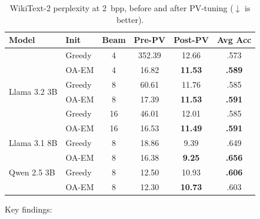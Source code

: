 \documentclass[11pt]{article}
\begin{document}
\begin{table}[h]
\centering
\caption{WikiText-2 perplexity at 2~bpp, before and after PV-tuning ($\downarrow$ is better).}
\begin{tabular}{llcccc}
\toprule
\textbf{Model} & \textbf{Init} & \textbf{Beam} & \textbf{Pre-PV} & \textbf{Post-PV} & \textbf{Avg Acc} \\
\midrule
\multirow{6}{*}{Llama 3.2 3B} & Greedy & 4 & 352.39 & 12.66 & .573 \\
 & OA-EM & 4 & 16.82 & \textbf{11.53} & \textbf{.589} \\
\cmidrule{2-6}
 & Greedy & 8 & 60.61 & 11.76 & .585 \\
 & OA-EM & 8 & 17.39 & \textbf{11.53} & \textbf{.591} \\
\cmidrule{2-6}
 & Greedy & 16 & 46.01 & 12.01 & .585 \\
 & OA-EM & 16 & 16.53 & \textbf{11.49} & \textbf{.591} \\
\midrule
Llama 3.1 8B & Greedy & 8 & 18.86 & 9.39 & .649 \\
 & OA-EM & 8 & 16.38 & \textbf{9.25} & \textbf{.656} \\
\midrule
Qwen 2.5 3B & Greedy & 8 & 12.50 & 10.93 & \textbf{.606} \\
 & OA-EM & 8 & 12.30 & \textbf{10.73} & .603 \\
\bottomrule
\end{tabular}
\end{table}

Key findings:
\end{document}
